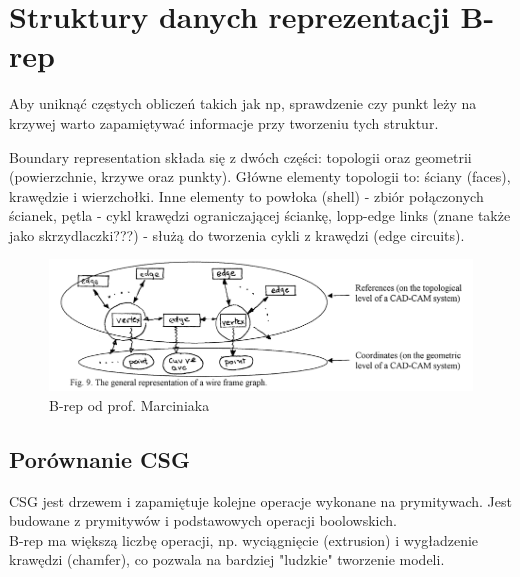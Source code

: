 \documentclass[12pt]{article}
\begin{document}
\section{Struktury danych reprezentacji B-rep}
Aby uniknąć częstych obliczeń takich jak np, sprawdzenie czy punkt leży na krzywej warto zapamiętywać informacje przy tworzeniu tych struktur.


Boundary representation składa się z dwóch części: topologii oraz geometrii (powierzchnie, krzywe oraz punkty). Główne elementy topologii to: ściany (faces), krawędzie i wierzchołki. Inne elementy to powłoka (shell) - zbiór połączonych ścianek, pętla - cykl krawędzi ograniczającej ściankę, lopp-edge links (znane także jako skrzydlaczki???) - służą do tworzenia cykli z krawędzi (edge circuits). 

\begin{figure}[H]
	\centering
	\includegraphics[scale=0.5]{Pictures/brep}
	\caption{B-rep od prof. Marciniaka}
\end{figure}

\subsection{Porównanie CSG}
CSG jest drzewem i zapamiętuje kolejne operacje wykonane na prymitywach. Jest budowane z prymitywów i podstawowych operacji boolowskich.\\
B-rep ma większą liczbę operacji, np. wyciągnięcie (extrusion) i wygładzenie krawędzi (chamfer), co pozwala na bardziej "ludzkie" tworzenie modeli.
\end{document}

